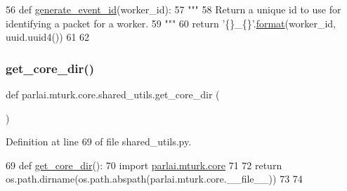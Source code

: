 \begin{DoxyCode}
56 \textcolor{keyword}{def }\hyperlink{namespaceparlai_1_1mturk_1_1core_1_1shared__utils_aba2e4d48063dafc80e931f8925dbb755}{generate\_event\_id}(worker\_id):
57     \textcolor{stringliteral}{"""}
58 \textcolor{stringliteral}{    Return a unique id to use for identifying a packet for a worker.}
59 \textcolor{stringliteral}{    """}
60     \textcolor{keywordflow}{return} \textcolor{stringliteral}{'\{\}\_\{\}'}.\hyperlink{namespaceparlai_1_1mturk_1_1core_1_1shared__utils_afcac728e96b38bbad8cde6f7be4f613e}{format}(worker\_id, uuid.uuid4())
61 
62 
\end{DoxyCode}
\mbox{\label{namespaceparlai_1_1mturk_1_1core_1_1shared__utils_ac4e340ccc66c691fdd294c734dae0c5d}} 
\subsubsection{\texorpdfstring{get\+\_\+core\+\_\+dir()}{get\_core\_dir()}}
{\footnotesize\ttfamily def parlai.\+mturk.\+core.\+shared\+\_\+utils.\+get\+\_\+core\+\_\+dir (\begin{DoxyParamCaption}{ }\end{DoxyParamCaption})}



Definition at line 69 of file shared\+\_\+utils.\+py.


\begin{DoxyCode}
69 \textcolor{keyword}{def }\hyperlink{namespaceparlai_1_1mturk_1_1core_1_1shared__utils_ac4e340ccc66c691fdd294c734dae0c5d}{get\_core\_dir}():
70     \textcolor{keyword}{import} \hyperlink{namespaceparlai_1_1mturk_1_1core}{parlai.mturk.core}
71 
72     \textcolor{keywordflow}{return} os.path.dirname(os.path.abspath(parlai.mturk.core.\_\_file\_\_))
73 
74 
\end{DoxyCode}
\mbox{\label{namespaceparlai_1_1mturk_1_1core_1_1shared__utils_aabd480fc6090e1fa769ff3926f7e842d}} 
